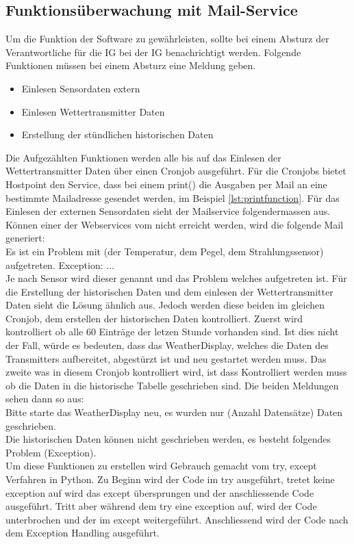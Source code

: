 \subsection{Funktionsüberwachung mit Mail-Service}
Um die Funktion der Software zu gewährleisten, sollte bei einem Absturz der Verantwortliche für die IG bei der IG benachrichtigt werden. Folgende Funktionen müssen bei einem Absturz eine Meldung geben.
\begin{itemize}
\item Einlesen Sensordaten extern
\item Einlesen Wettertransmitter Daten
\item Erstellung der stündlichen historischen Daten
\end{itemize}
Die Aufgezählten Funktionen werden alle bis auf das Einlesen der Wettertransmitter Daten über einen Cronjob ausgeführt. Für die Cronjobs bietet Hostpoint den Service, dass bei einem print() die Ausgaben per Mail an eine bestimmte Mailadresse gesendet werden, im Beispiel \ref{lst:printfunction}. Für das Einlesen der externen Sensordaten sieht der Mailservice folgendermassen aus. Können einer der Webservices vom  nicht erreicht werden, wird die folgende Mail generiert:\\
Es ist ein Problem mit (der Temperatur, dem Pegel, dem Strahlungssensor) aufgetreten. Exception: ...\\
Je nach Sensor wird dieser genannt und das Problem welches aufgetreten ist. Für die Erstellung der historischen Daten und dem einlesen der Wettertransmitter Daten sieht die Lösung ähnlich aus. Jedoch werden diese beiden im gleichen Cronjob, dem erstellen der historischen Daten kontrolliert. Zuerst wird kontrolliert ob alle 60 Einträge der letzen Stunde vorhanden sind. Ist dies nicht der Fall, würde es bedeuten, dass das WeatherDisplay, welches die Daten des Transmitters aufbereitet, abgestürzt ist und neu gestartet werden muss. Das zweite was in diesem Cronjob kontrolliert wird, ist dass Kontrolliert werden muss ob die Daten in die historische Tabelle geschrieben sind. Die beiden Meldungen sehen dann so aus:\\
Bitte starte das WeatherDisplay neu, es wurden nur (Anzahl Datensätze) Daten geschrieben.\\
Die historischen Daten können nicht geschrieben werden, es besteht folgendes Problem (Exception).\\

Um diese Funktionen zu erstellen wird Gebrauch gemacht vom try, except Verfahren in Python. Zu Beginn wird der Code im try ausgeführt, tretet keine exception auf wird das except übersprungen und der anschliessende Code ausgeführt. Tritt aber während dem try eine exception auf, wird der Code unterbrochen und der im except weitergeführt. Anschliessend wird der Code nach dem Exception Handling ausgeführt.\cite{ThePythonTutorial8.ErrorsAndExceptions:Python}

